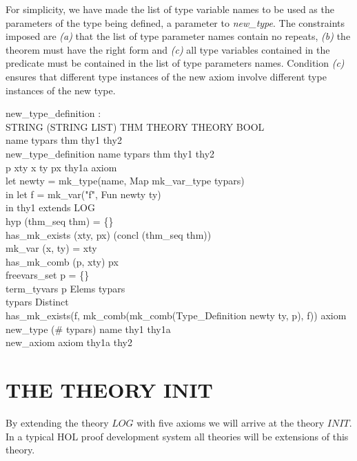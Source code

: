 \documentclass[a4paper,11pt,titlepage]{article}
\begin{document}
\begin{titlepage}
For simplicity, we have made the list of type variable
names to be used as the parameters of the type being
defined, a parameter to {\it new\_type}.
The constraints imposed are {\it (a)} that the list
of type parameter names contain
no repeats, {\it (b)} the theorem must have the right form
and {\it (c)} all type variables contained in the
predicate must be contained in the list of type parameters
names.
Condition {\it (c)} ensures that different type instances
of the new axiom involve different type instances of
the new type.

\begin{HOLConst}
\+	\PrNL{}new\_type\_definition\PrNN{} :\\
\+	STRING \MMM{\rightarrow} (STRING LIST) \MMM{\rightarrow} THM \MMM{\rightarrow} THEORY \MMM{\rightarrow} THEORY \MMM{\rightarrow} BOOL\\
\PrPH{}
\+	\MMM{\forall} name typars thm thy1 thy2 \MMM{\bullet}\\
\+	new\_type\_definition name typars thm thy1 thy2 \MMM{\Leftrightarrow}\\
\+	\MMM{\exists} p xty x ty px thy1a axiom \MMM{\bullet}\\
\+	let newty = mk\_type(name, Map mk\_var\_type typars)\\
\+	in let f = mk\_var("f", Fun newty ty)\\
\+	in 	thy1 extends LOG\\
\+	\MMM{\land}	hyp (thm\_seq thm) = \{\}\\
\+	\MMM{\land}	has\_mk\_exists (xty, px) (concl (thm\_seq thm))\\
\+	\MMM{\land}	mk\_var (x, ty) = xty\\
\+	\MMM{\land}	has\_mk\_comb (p, xty) px\\
\+	\MMM{\land}	freevars\_set p = \{\}\\
\+	\MMM{\land}	term\_tyvars p \MMM{\subseteq} Elems typars\\
\+	\MMM{\land}	typars \MMM{\in} Distinct\\
\+	\MMM{\land}	has\_mk\_exists(f, mk\_comb(mk\_comb(Type\_Definition newty ty, p), f)) axiom\\
\+	\MMM{\land}	new\_type (\# typars) name thy1 thy1a\\
\+	\MMM{\land}	new\_axiom axiom thy1a thy2\\
\end{HOLConst}
\section{THE THEORY INIT}
\label{INIT}
By extending the theory $LOG$ with five axioms
we will arrive at the theory $INIT$. In a typical
HOL proof development system all theories will be
extensions of this theory.



\end{titlepage}
\end{document}

